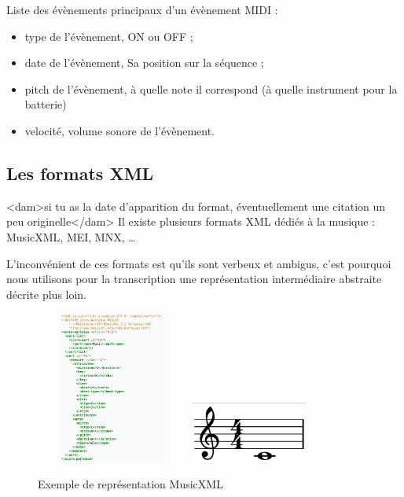 Liste des évènements principaux d’un évènement MIDI :
\begin{itemize}
    \item type de l’évènement, ON ou OFF ;
    \item date de l’évènement, Sa position sur la séquence ;
    \item pitch de l’évènement, à quelle note il correspond (à quelle
        instrument pour la batterie)
    \item velocité, volume sonore de l’évènement.\\
\end{itemize}

\subsection*{Les formats XML}
<dam>si tu as la date d'apparition du format, éventuellement une citation un
peu originelle</dam>
Il existe plusieurs formats XML dédiés à la musique : MusicXML, MEI, MNX, …

L’inconvénient de ces formats est qu’ils sont verbeux et ambigus, c’est
pourquoi nous utilisons pour la transcription une représentation intermédiaire
abstraite décrite plus loin.


\begin{figure}[h]
	\centering
	\includegraphics[height=50mm, width=50mm]{
    z_images/1_contexte/6_musicxml_0.png}
    \includegraphics[height=20mm, width=40mm]{
    z_images/1_contexte/6_musicxml_1.png}
	\caption{Exemple de représentation MusicXML} 
	\label{MusicXML}
\end{figure}

